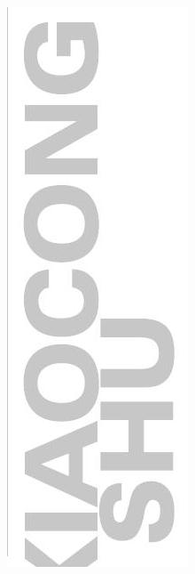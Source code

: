 \documentclass[10pt]{article}
\begin{document}
\includegraphics[max width=\textwidth, center]{2024_10_30_1bf34f7aeb61f11d11d3g-002(2)}
\end{document}
